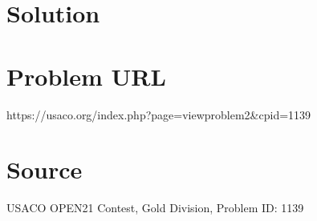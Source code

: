 \documentclass[12pt]{article}
\begin{document}
\section*{Solution}


\section*{Problem URL}
https://usaco.org/index.php?page=viewproblem2&cpid=1139

\section*{Source}
USACO OPEN21 Contest, Gold Division, Problem ID: 1139
\end{document}
